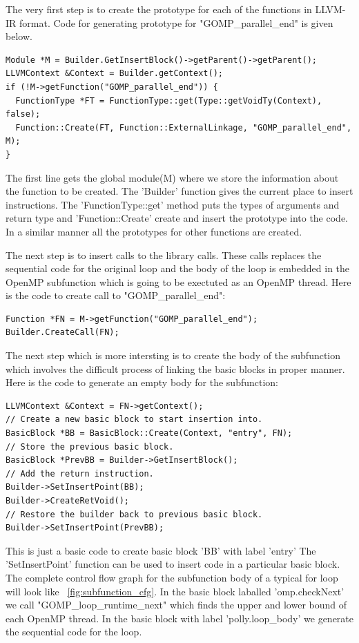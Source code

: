 The very first step is to create the prototype for each of the functions in LLVM-IR format\cite{kaleid}.
Code for generating prototype for "GOMP\_parallel\_end" is given below.
{\footnotesize
\begin{lstlisting}
Module *M = Builder.GetInsertBlock()->getParent()->getParent();
LLVMContext &Context = Builder.getContext();
if (!M->getFunction("GOMP_parallel_end")) {
  FunctionType *FT = FunctionType::get(Type::getVoidTy(Context), false);
  Function::Create(FT, Function::ExternalLinkage, "GOMP_parallel_end", M);
}
\end{lstlisting}
}
The first line gets the global module(M) where we store the information about the function to be created.
The 'Builder' function gives the current place to insert instructions. The 'FunctionType::get' method
puts the types of arguments and return type and 'Function::Create' create and insert the prototype
into the code. In a similar manner all the prototypes for other functions are created.

The next step is to insert calls to the library calls. These calls replaces the sequential code for
the original loop and the body of the loop is embedded in the OpenMP subfunction which is
going to be exectuted as an OpenMP thread. Here is the code to create call to "GOMP\_parallel\_end":
{\footnotesize
\begin{lstlisting}
Function *FN = M->getFunction("GOMP_parallel_end");
Builder.CreateCall(FN);
\end{lstlisting}
}

The next step which is more intersting is to create the body of the subfunction which involves the difficult process of
linking the basic blocks in proper manner. Here is the code to generate an empty body for the subfunction:
{\footnotesize
\begin{lstlisting}
LLVMContext &Context = FN->getContext();
// Create a new basic block to start insertion into.
BasicBlock *BB = BasicBlock::Create(Context, "entry", FN);
// Store the previous basic block.
BasicBlock *PrevBB = Builder->GetInsertBlock();
// Add the return instruction.
Builder->SetInsertPoint(BB);
Builder->CreateRetVoid();
// Restore the builder back to previous basic block.
Builder->SetInsertPoint(PrevBB);
\end{lstlisting}
}
This is just a basic code to create basic block 'BB' with label 'entry' The 'SetInsertPoint' function
can be used to insert code in a particular basic block. The complete control flow graph for the
subfunction body of a typical for loop will look like ~\ref{fig:subfunction_cfg}. In the basic
block laballed 'omp.checkNext' we call "GOMP\_loop\_runtime\_next" which finds the upper and 
lower bound of each OpenMP thread. In the basic block with label 'polly.loop\_body' we
generate the sequential code for the loop.

